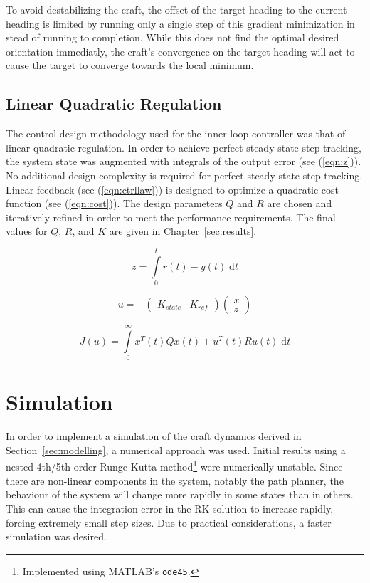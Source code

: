 \documentclass{sydeStyle}
\begin{document}
To avoid destabilizing the craft, the offset of the target heading to the
current heading is limited by running only a single step of this gradient
minimization in stead of running to completion. While this does not find the
optimal desired orientation immediatly, the craft's convergence on the target
heading will act to cause the target to converge towards the local minimum.

\subsection{Linear Quadratic Regulation}
\label{sec:lqr}
The control design methodology used for the inner-loop controller was that of
linear quadratic regulation.  In order to achieve perfect steady-state step
tracking, the system state was augmented with integrals of the output error (see
(\ref{eqn:z})).  No additional design complexity is required for perfect
steady-state step tracking.  Linear feedback (see (\ref{eqn:ctrllaw})) is
designed to optimize a quadratic cost function (see (\ref{eqn:cost})).  The
design parameters $Q$ and $R$ are chosen and iteratively refined in order to
meet the performance requirements.  The final values for $Q$, $R$, and $K$ are
given in Chapter~\ref{sec:results}.

\begin{equation}
    z = \int\limits_0^t r(t) - y(t) \; \textrm{d}t
    \label{eqn:z}
\end{equation}

\begin{equation}
    u
    =
    -
    \begin{pmatrix}
        K_{state} & K_{ref}
    \end{pmatrix}
    \begin{pmatrix}
        x \\ z
    \end{pmatrix}
    \label{eqn:ctrllaw}
\end{equation}

\begin{equation}
    J(u) = \int\limits_0^\infty x^T(t)Qx(t) + u^T(t)Ru(t) \; \textrm{d}t
    \label{eqn:cost}
\end{equation}

\section{Simulation}
\label{sec:simulation}
In order to implement a simulation of the craft dynamics derived in
Section~\ref{sec:modelling}, a numerical approach was used.  Initial results
using a nested 4th/5th order Runge-Kutta method\footnote{Implemented using
MATLAB's \texttt{ode45}.} were numerically unstable.  Since there are non-linear
components in the system, notably the path planner, the behaviour of the system
will change more rapidly in some states than in others.  This can cause the
integration error in the RK solution to increase rapidly, forcing extremely
small step sizes.  Due to practical considerations, a faster simulation was
desired.
\end{document}
